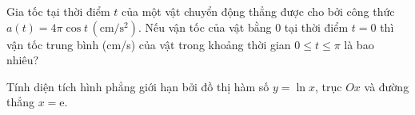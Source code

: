 \begin{ex}%
	Gia tốc tại thời điểm $t$ của một vật chuyển động thẳng được cho bởi công thức $a(t)=4\pi\cos t\,\left(\mathrm{cm/s^2}\right)$. Nếu vận tốc của vật bằng $0$ tại thời điểm $t=0$ thì vận tốc trung bình (cm/s) của vật trong khoảng thời gian $0\leq t\leq \pi$ là bao nhiêu?
\end{ex}

\begin{ex}%
	Tính diện tích hình phẳng giới hạn bởi đồ thị hàm số $y=\ln x$, trục $Ox$ và đường thẳng $x=\mathrm{e}$.
\end{ex}

